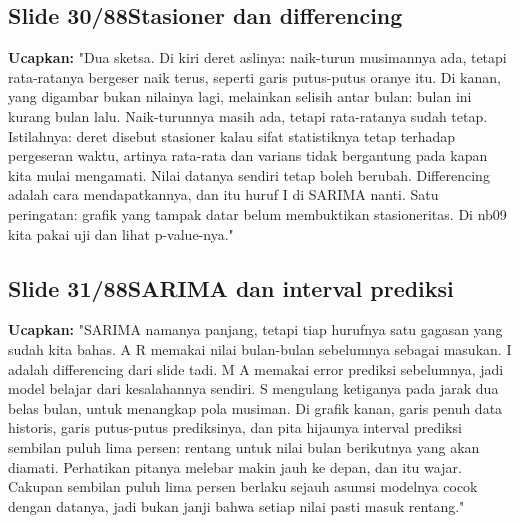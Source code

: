 \documentclass[11pt]{article}
\renewcommand{\framebox}[1]{\colorbox{acc!15}{\textcolor{acc}{\textbf{#1}}}}
\begin{document}
\subsection*{\framebox{Slide 30/88}\quad Stasioner dan differencing}
\textbf{Ucapkan:} "Dua sketsa. Di kiri deret aslinya: naik-turun musimannya ada, tetapi rata-ratanya bergeser naik terus, seperti garis putus-putus oranye itu. Di kanan, yang digambar bukan nilainya lagi, melainkan selisih antar bulan: bulan ini kurang bulan lalu. Naik-turunnya masih ada, tetapi rata-ratanya sudah tetap. Istilahnya: deret disebut stasioner kalau sifat statistiknya tetap terhadap pergeseran waktu, artinya rata-rata dan varians tidak bergantung pada kapan kita mulai mengamati. Nilai datanya sendiri tetap boleh berubah. Differencing adalah cara mendapatkannya, dan itu huruf I di SARIMA nanti. Satu peringatan: grafik yang tampak datar belum membuktikan stasioneritas. Di nb09 kita pakai uji dan lihat p-value-nya."\\[2pt]

\subsection*{\framebox{Slide 31/88}\quad SARIMA dan interval prediksi}
\textbf{Ucapkan:} "SARIMA namanya panjang, tetapi tiap hurufnya satu gagasan yang sudah kita bahas. A R memakai nilai bulan-bulan sebelumnya sebagai masukan. I adalah differencing dari slide tadi. M A memakai error prediksi sebelumnya, jadi model belajar dari kesalahannya sendiri. S mengulang ketiganya pada jarak dua belas bulan, untuk menangkap pola musiman. Di grafik kanan, garis penuh data historis, garis putus-putus prediksinya, dan pita hijaunya interval prediksi sembilan puluh lima persen: rentang untuk nilai bulan berikutnya yang akan diamati. Perhatikan pitanya melebar makin jauh ke depan, dan itu wajar. Cakupan sembilan puluh lima persen berlaku sejauh asumsi modelnya cocok dengan datanya, jadi bukan janji bahwa setiap nilai pasti masuk rentang."\\[2pt]
\end{document}
